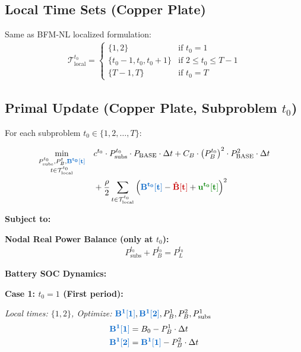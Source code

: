 \documentclass[11pt]{article}
\newcommand{\blueB}[1]{\textcolor{bluevar}{\mathbf{#1}}}      %
\newcommand{\redBhat}[1]{\textcolor{redvar}{\mathbf{#1}}}     %
\newcommand{\greenu}[1]{\textcolor{greenvar}{\mathbf{#1}}}    %
\begin{document}
\subsection{Local Time Sets (Copper Plate)}

Same as BFM-NL localized formulation:
\begin{align}
\mathcal{T}_{\text{local}}^{t_0} = \begin{cases}
\{1, 2\} & \text{if } t_0 = 1 \\
\{t_0-1, t_0, t_0+1\} & \text{if } 2 \leq t_0 \leq T-1 \\
\{T-1, T\} & \text{if } t_0 = T
\end{cases}
\end{align}

\subsection{Primal Update (Copper Plate, Subproblem $t_0$)}

For each subproblem $t_0 \in \{1, 2, \ldots, T\}$:

\begin{align}
\min_{\substack{P_{\text{subs}}^{t_0}, P_B^t, \blueB{B^{t_0}[t]} \\ t \in \mathcal{T}_{\text{local}}^{t_0}}} \quad & c^{t_0} \cdot P_{\text{subs}}^{t_0} \cdot P_{\text{BASE}} \cdot \Delta t + C_B \cdot \left(P_B^{t_0}\right)^2 \cdot P_{\text{BASE}}^2 \cdot \Delta t \notag \\
& + \frac{\rho}{2} \sum_{t \in \mathcal{T}_{\text{local}}^{t_0}} \left( \blueB{B^{t_0}[t]} - \redBhat{\hat{B}[t]} + \greenu{u^{t_0}[t]} \right)^2
\end{align}

\textbf{Subject to:}

\textbf{Nodal Real Power Balance (only at $t_0$):}
\begin{align}
P_{\text{subs}}^{t_0} + P_B^{t_0} = P_L^{t_0}
\end{align}

\textbf{Battery SOC Dynamics:}

\noindent\textbf{Case 1: $t_0 = 1$ (First period):}

\textit{Local times: $\{1, 2\}$, Optimize: $\blueB{B^{1}[1]}, \blueB{B^{1}[2]}, P_B^1, P_B^2, P_{\text{subs}}^1$}
\begin{align}
\blueB{B^{1}[1]} &= B_0 - P_B^1 \cdot \Delta t \\
\blueB{B^{1}[2]} &= \blueB{B^{1}[1]} - P_B^2 \cdot \Delta t
\end{align}
\end{document}
